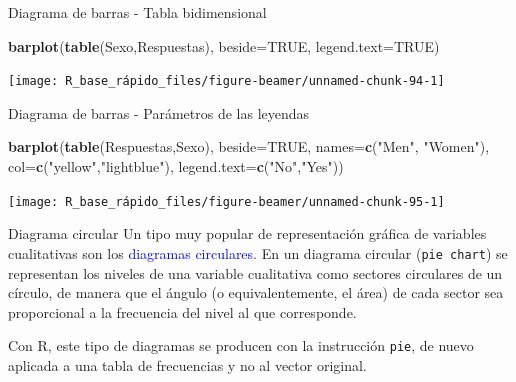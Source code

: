 \documentclass[
  ignorenonframetext,
  aspectratio=169]{beamer}
\newenvironment{Shaded}{\begin{snugshade}}{\end{snugshade}}
\newcommand{\AttributeTok}[1]{\textcolor[rgb]{0.13,0.29,0.53}{#1}}
\newcommand{\ConstantTok}[1]{\textcolor[rgb]{0.56,0.35,0.01}{#1}}
\newcommand{\FunctionTok}[1]{\textcolor[rgb]{0.13,0.29,0.53}{\textbf{#1}}}
\newcommand{\NormalTok}[1]{#1}
\newcommand{\StringTok}[1]{\textcolor[rgb]{0.31,0.60,0.02}{#1}}
\newcommand\blue[1]{\textcolor{blue}{#1}}
\begin{document}
\begin{frame}[fragile]{Diagrama de barras - Tabla bidimensional}
\label{diagrama-de-barras---tabla-bidimensional-1}
\begin{Shaded}
\begin{Highlighting}[]
\FunctionTok{barplot}\NormalTok{(}\FunctionTok{table}\NormalTok{(Sexo,Respuestas), }\AttributeTok{beside=}\ConstantTok{TRUE}\NormalTok{, }
        \AttributeTok{legend.text=}\ConstantTok{TRUE}\NormalTok{)}
\end{Highlighting}
\end{Shaded}

\begin{center}\texttt{[image: R\_base\_rápido\_files/figure-beamer/unnamed-chunk-94-1]} \end{center}
\end{frame}

\begin{frame}[fragile]{Diagrama de barras - Parámetros de las leyendas}
\label{diagrama-de-barras---paruxe1metros-de-las-leyendas}
\begin{Shaded}
\begin{Highlighting}[]
\FunctionTok{barplot}\NormalTok{(}\FunctionTok{table}\NormalTok{(Respuestas,Sexo), }\AttributeTok{beside=}\ConstantTok{TRUE}\NormalTok{, }
        \AttributeTok{names=}\FunctionTok{c}\NormalTok{(}\StringTok{"Men"}\NormalTok{, }\StringTok{"Women"}\NormalTok{), }\AttributeTok{col=}\FunctionTok{c}\NormalTok{(}\StringTok{"yellow"}\NormalTok{,}\StringTok{"lightblue"}\NormalTok{),  }\AttributeTok{legend.text=}\FunctionTok{c}\NormalTok{(}\StringTok{"No"}\NormalTok{,}\StringTok{"Yes"}\NormalTok{))}
\end{Highlighting}
\end{Shaded}

\begin{center}\texttt{[image: R\_base\_rápido\_files/figure-beamer/unnamed-chunk-95-1]} \end{center}
\end{frame}

\begin{frame}[fragile]{Diagrama circular}
\label{diagrama-circular}
Un tipo muy popular de representación gráfica de variables cualitativas
son los \blue{diagramas circulares}. En un diagrama circular
(\texttt{pie\ chart}) se representan los niveles de una variable
cualitativa como sectores circulares de un círculo, de manera que el
ángulo (o equivalentemente, el área) de cada sector sea proporcional a
la frecuencia del nivel al que corresponde.

Con R, este tipo de diagramas se producen con la instrucción
\texttt{pie}, de nuevo aplicada a una tabla de frecuencias y no al
vector original.
\end{frame}
\end{document}

